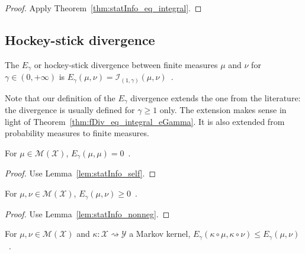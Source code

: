\begin{proof}%
{}
Apply Theorem~\ref{thm:statInfo_eq_integral}.
\end{proof}

\subsection{Hockey-stick divergence}


\begin{definition}
  \label{def:eGamma}
  The $E_\gamma$ or hockey-stick divergence between finite measures $\mu$ and $\nu$ for $\gamma \in (0,+\infty)$ is $E_\gamma(\mu, \nu) = \mathcal I_{(1,\gamma)}(\mu, \nu)$~.
\end{definition}

Note that our definition of the $E_\gamma$ divergence extends the one from the literature: the divergence is usually defined for $\gamma \ge 1$ only.
The extension makes sense in light of Theorem~\ref{thm:fDiv_eq_integral_eGamma}.
It is also extended from probability measures to finite measures.

\begin{lemma}
  \label{lem:eGamma_self}
  For $\mu \in \mathcal M(\mathcal X)$, $E_\gamma(\mu, \mu) = 0$~.
\end{lemma}

\begin{proof}%
{}
Use Lemma~\ref{lem:statInfo_self}.
\end{proof}

\begin{lemma}
  \label{lem:eGamma_nonneg}
  For $\mu, \nu \in \mathcal M(\mathcal X)$, $E_\gamma(\mu, \nu) \ge 0$~.
\end{lemma}

\begin{proof}%
{}
Use Lemma~\ref{lem:statInfo_nonneg}.
\end{proof}

\begin{theorem}
  \label{thm:data_proc_eGamma}
  For $\mu, \nu \in \mathcal M(\mathcal X)$ and $\kappa : \mathcal X \rightsquigarrow \mathcal Y$ a Markov kernel, $E_\gamma(\kappa \circ \mu, \kappa \circ \nu) \le E_\gamma(\mu, \nu)$~.
\end{theorem}

